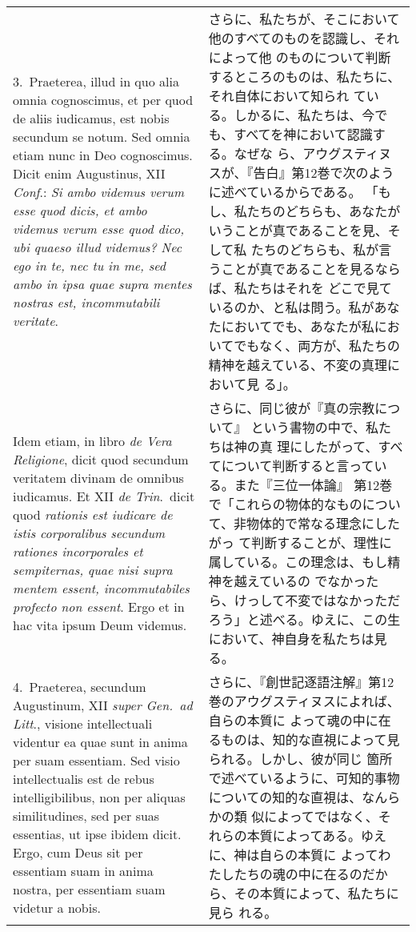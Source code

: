 \documentclass[10pt]{jsarticle} %
\begin{document}
\begin{longtable}{p{21em}p{21em}}
3.~{\sc Praeterea}, illud in quo alia omnia cognoscimus, et per quod
de aliis iudicamus, est nobis secundum se notum. Sed omnia etiam nunc
in Deo cognoscimus. Dicit enim Augustinus, XII {\it Conf}.: {\it Si
ambo videmus verum esse quod dicis, et ambo videmus verum esse quod
dico, ubi quaeso illud videmus? Nec ego in te, nec tu in me, sed ambo
in ipsa quae supra mentes nostras est, incommutabili
veritate}.

&

さらに、私たちが、そこにおいて他のすべてのものを認識し、それによって他
のものについて判断するところのものは、私たちに、それ自体において知られ
ている。しかるに、私たちは、今でも、すべてを神において認識する。なぜな
ら、アウグスティヌスが、『告白』第12巻で次のように述べているからである。
「もし、私たちのどちらも、あなたがいうことが真であることを見、そして私
たちのどちらも、私が言うことが真であることを見るならば、私たちはそれを
どこで見ているのか、と私は問う。私があなたにおいてでも、あなたが私にお
いてでもなく、両方が、私たちの精神を越えている、不変の真理において見
る」。

\\

Idem etiam, in libro {\it de Vera Religione}, dicit quod secundum
veritatem divinam de omnibus iudicamus. Et XII {\it de Trin}.~dicit
quod {\it rationis est iudicare de istis corporalibus secundum
rationes incorporales et sempiternas, quae nisi supra mentem essent,
incommutabiles profecto non essent}. Ergo et in hac vita ipsum Deum
videmus.

&

さらに、同じ彼が『真の宗教について』 という書物の中で、私たちは神の真
理にしたがって、すべてについて判断すると言っている。また『三位一体論』
第12巻で「これらの物体的なものについて、非物体的で常なる理念にしたがっ
て判断することが、理性に属している。この理念は、もし精神を越えているの
でなかったら、けっして不変ではなかっただろう」と述べる。ゆえに、この生
において、神自身を私たちは見る。

\\

4.~{\sc Praeterea}, secundum Augustinum, XII {\it super Gen.~ad
Litt}., visione intellectuali videntur ea quae sunt in anima per suam
essentiam. Sed visio intellectualis est de rebus intelligibilibus, non
per aliquas similitudines, sed per suas essentias, ut ipse ibidem
dicit. Ergo, cum Deus sit per essentiam suam in anima nostra, per
essentiam suam videtur a nobis.

&

さらに、『創世記逐語注解』第12巻のアウグスティヌスによれば、自らの本質に
よって魂の中に在るものは、知的な直視によって見られる。しかし、彼が同じ
箇所で述べているように、可知的事物についての知的な直視は、なんらかの類
似によってではなく、それらの本質によってある。ゆえに、神は自らの本質に
よってわたしたちの魂の中に在るのだから、その本質によって、私たちに見ら
れる。


\end{longtable}
\end{document}
